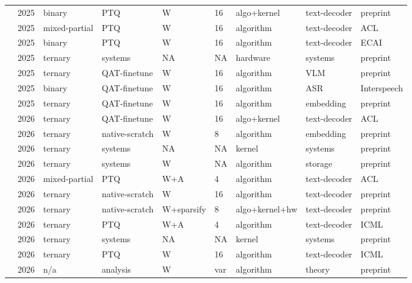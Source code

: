 \begin{landscape}
\begin{longtable}{p{3.2cm} p{1cm} p{1.9cm} p{2.2cm} p{2.2cm} p{1.3cm} p{2.2cm} p{2.1cm} p{2.5cm}}
\citet{Anon2025-ProgBinPruning} & 2025 & binary & PTQ & W & 16 & algo+\allowbreak{}kernel & text-decoder & preprint \\
\citet{Zhao2025-PTQ161} & 2025 & mixed-partial & PTQ & W & 16 & algorithm & text-decoder & ACL \\
\citet{Xia2025-SDQLLM} & 2025 & binary & PTQ & W & 16 & algorithm & text-decoder & ECAI \\
\citet{Anon2025-TENET} & 2025 & ternary & systems & NA & NA & hardware & systems & preprint \\
\citet{Anon2025-VLMTernarization} & 2025 & ternary & QAT-finetune & W & 16 & algorithm & VLM & preprint \\
\citet{Anon2025-OneBitASR} & 2025 & binary & QAT-finetune & W & 16 & algorithm & ASR & Interspeech \\
\citet{Connor2025-UltraQuantisation} & 2025 & ternary & QAT-finetune & W & 16 & algorithm & embedding & preprint \\
\citet{Huang2026-Sherry} & 2026 & ternary & QAT-finetune & W & 16 & algo+\allowbreak{}kernel & text-decoder & ACL \\
\citet{Li2026-BitNetTextEmbeddings} & 2026 & ternary & native-scratch & W & 8 & algorithm & embedding & preprint \\
\citet{Anon2026-Litespark} & 2026 & ternary & systems & NA & NA & kernel & systems & preprint \\
\citet{Anon2026-NativeTernary} & 2026 & ternary & systems & W & NA & algorithm & storage & preprint \\
\citet{Song2026-LBLLM} & 2026 & mixed-partial & PTQ & W+\allowbreak{}A & 4 & algorithm & text-decoder & ACL \\
\citet{Nargund2026-TernaryLM} & 2026 & ternary & native-scratch & W & 16 & algorithm & text-decoder & preprint \\
\citet{Zhang2026-SparseBitNet} & 2026 & ternary & native-scratch & W+\allowbreak{}sparsify & 8 & algo+\allowbreak{}kernel+\allowbreak{}hw & text-decoder & preprint \\
\citet{Zhao2026-TWLA} & 2026 & ternary & PTQ & W+\allowbreak{}A & 4 & algorithm & text-decoder & ICML \\
\citet{Zuo2026-FairyFuse} & 2026 & ternary & systems & NA & NA & kernel & systems & preprint \\
\citet{Wang2026-CATQ} & 2026 & ternary & PTQ & W & 16 & algorithm & text-decoder & ICML \\
\citet{Anon2026-EveryBitCounts} & 2026 & n/\allowbreak{}a & analysis & W & var & algorithm & theory & preprint \\

\end{longtable}
\end{landscape}
